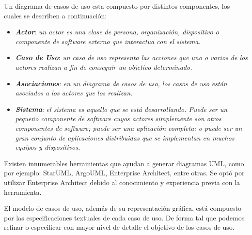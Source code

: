 \documentclass[11pt,oneside]{book}
\begin{document}
Un diagrama de casos de uso esta compuesto por distintos componentes, los cuales se describen a continuación:

\begin{itemize}
\item \textit{\textbf{Actor}}: \textit{un actor es una clase de persona, organización, dispositivo o componente de software externo que interactua con el sistema.}

\item \textit{\textbf{Caso de Uso}}: \textit{un caso de uso representa las acciones que uno o varios de los actores realizan a fin de conseguir un objetivo determinado.}

\item \textit{\textbf{Asociaciones}}: \textit{en un diagrama de casos de uso, los casos de uso están asociados a los actores que los realizan.}

\item \textit{\textbf{Sistema}}: \textit{el sistema es aquello que se está desarrollando. Puede ser un pequeño componente de software cuyos actores simplemente son otros componentes de software; puede ser una aplicación completa; o puede ser un gran conjunto de aplicaciones distribuidas que se implementan en muchos equipos y dispositivos.}
\end{itemize}

Existen innumerables herramientas que ayudan a generar diagramas UML, como por ejemplo: StarUML, ArgoUML, Enterprise Architect, entre otras. Se optó por utilizar Enterprise Architect debido al conocimiento y experiencia previa con la herramienta. 

El modelo de casos de uso, además de su representación gráfica, está compuesto por las especificaciones textuales de cada caso de uso. De forma tal que podemos refinar o especificar con mayor nivel de detalle el objetivo de los casos de uso.
\end{document}
